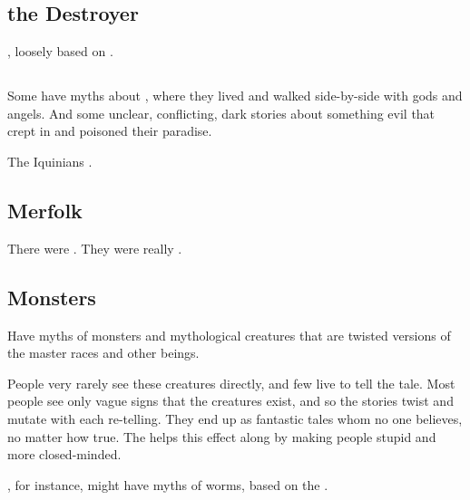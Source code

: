\subsection{\Isphet the Destroyer}
\index{\Isphet}
, loosely based on \QuessanthIshnaruchaefir. 











\subsection[Merkyrah]{\Merkyrah}
Some \humans{} have myths about \Merkyrah, where they lived and walked side-by-side with gods and angels. And some unclear, conflicting, dark stories about something evil that crept in and poisoned their paradise. 

The Iquinians .









\subsection{Merfolk}
There were .
They were really \nagae.








\subsection{Monsters}
Have myths of monsters and mythological creatures that are twisted versions of the master races and other beings. 

People very rarely see these creatures directly, and few live to tell the tale. Most people see only vague signs that the creatures exist, and so the stories twist and mutate with each re-telling. They end up as fantastic tales whom no one believes, no matter how true. The  helps this effect along by making people stupid and more closed-minded. 

, for instance, might have myths of worms, based on the . 





